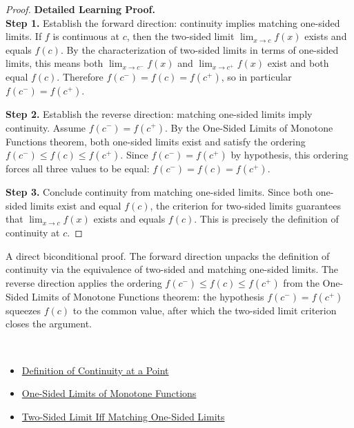 \begin{proof}
\textbf{Detailed Learning Proof.}~\\

\textbf{Step 1.} Establish the forward direction: continuity implies matching one-sided limits. If $f$ is continuous at $c$, then the two-sided limit $\lim_{x \to c} f(x)$ exists and equals $f(c)$. By the characterization of two-sided limits in terms of one-sided limits, this means both $\lim_{x \to c^{-}} f(x)$ and $\lim_{x \to c^{+}} f(x)$ exist and both equal $f(c)$. Therefore $f(c^{-}) = f(c) = f(c^{+})$, so in particular $f(c^{-}) = f(c^{+})$.

\textbf{Step 2.} Establish the reverse direction: matching one-sided limits imply continuity. Assume $f(c^{-}) = f(c^{+})$. By the One-Sided Limits of Monotone Functions theorem, both one-sided limits exist and satisfy the ordering $f(c^{-}) \leq f(c) \leq f(c^{+})$. Since $f(c^{-}) = f(c^{+})$ by hypothesis, this ordering forces all three values to be equal: $f(c^{-}) = f(c) = f(c^{+})$.

\textbf{Step 3.} Conclude continuity from matching one-sided limits. Since both one-sided limits exist and equal $f(c)$, the criterion for two-sided limits guarantees that $\lim_{x \to c} f(x)$ exists and equals $f(c)$. This is precisely the definition of continuity at $c$.
\end{proof}

\begin{remark*}
A direct biconditional proof. The forward direction unpacks the definition of continuity via the equivalence of two-sided and matching one-sided limits. The reverse direction applies the ordering $f(c^{-}) \leq f(c) \leq f(c^{+})$ from the One-Sided Limits of Monotone Functions theorem: the hypothesis $f(c^{-}) = f(c^{+})$ squeezes $f(c)$ to the common value, after which the two-sided limit criterion closes the argument.
\end{remark*}

\begin{remark*}[Dependencies]~\\
\begin{itemize}
  \item \hyperref[def:continuous-at-point]{Definition of Continuity at a Point}
  \item \hyperref[thm:monotone-one-sided-limits]{One-Sided Limits of Monotone Functions}
  \item \hyperref[thm:two-sided-limit-iff-matching-one-sided-limits]{Two-Sided Limit Iff Matching One-Sided Limits}
\end{itemize}
\end{remark*}
